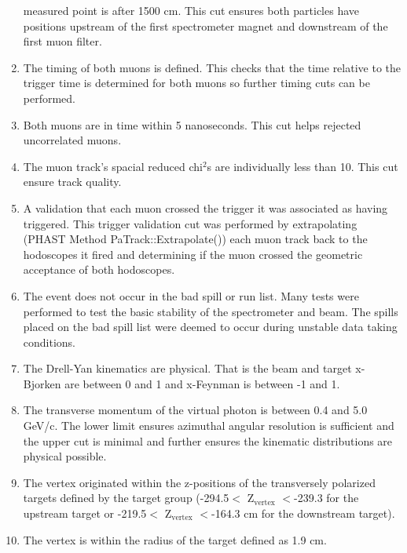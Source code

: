 \begin{enumerate}
  measured point is after 1500 cm.  This cut ensures both particles have
  positions upstream of the first spectrometer magnet and downstream of the
  first muon filter.
\item The timing of both muons is defined.  This checks that the time relative
  to the trigger time is determined for both muons so further timing cuts can be
  performed.
\item Both muons are in time within 5 nanoseconds.  This cut helps rejected
  uncorrelated muons.
\item The muon track's spacial reduced chi$^2$s are individually less than 10.
  This cut ensure track quality.
\item A validation that each muon crossed the trigger it was associated as
  having triggered.  This trigger validation cut was performed by extrapolating
  (PHAST Method PaTrack::Extrapolate()) each muon track back to the hodoscopes
  it fired and determining if the muon crossed the geometric acceptance of both
  hodoscopes.
\item The event does not occur in the bad spill or run list.  Many tests were
  performed to test the basic stability of the spectrometer and beam.  The
  spills placed on the bad spill list were deemed to occur during unstable data
  taking conditions.
\item The Drell-Yan kinematics are physical.  That is the beam and target
  x-Bjorken are between 0 and 1 and x-Feynman is between -1 and 1.
\item The transverse momentum of the virtual photon is between 0.4 and 5.0
  GeV/c.  The lower limit ensures azimuthal angular resolution is sufficient and
  the upper cut is minimal and further ensures the kinematic distributions are
  physical possible.
\item The vertex originated within the z-positions of the transversely polarized
  targets defined by the target group (-294.5$<$ Z$_{\mathrm{vertex}}$ $<$-239.3
  for the upstream target or -219.5$<$ Z$_{\mathrm{vertex}}$ $<$-164.3 cm for
  the downstream target).
\item The vertex is within the radius of the target defined as 1.9 cm.
\end{enumerate}

